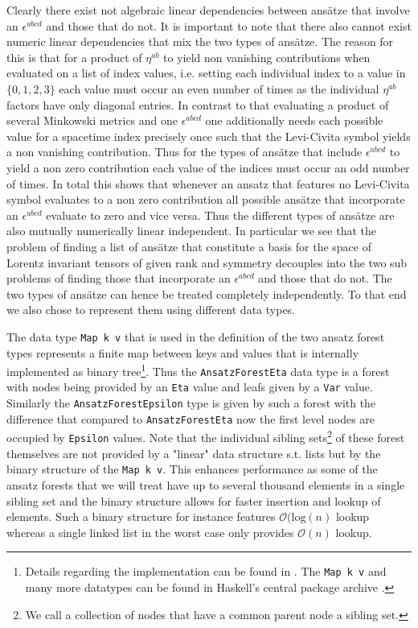 \documentclass[a4paper,12pt, DIV=14, BCOR=5mm, twoside, headsepline]{scrbook}
\begin{document}
Clearly there exist not algebraic linear dependencies between ansätze that involve an $\epsilon^{abcd}$ and those that do not. 
It is important to note that there also cannot exist numeric linear dependencies that mix the two types of ansätze. The reason for this is that for a product of $\eta^{ab}$ to yield non vanishing contributions when evaluated on a list of index values, i.e. setting each individual index to a value in $\{0,1,2,3 \}$ each value must occur an even number of times as the individual $\eta^{ab}$ factors have only diagonal entries. In contrast to that evaluating a product of several Minkowski metrics and one $\epsilon^{abcd}$ one additionally needs each possible value for a spacetime index precisely once such that the Levi-Civita symbol yields a non vanishing contribution. Thus for the types of ansätze that include $\epsilon^{abcd}$ to yield a non zero contribution each value of the indices must occur an odd number of times. In total this shows that whenever an ansatz that features no Levi-Civita symbol evaluates to a non zero contribution all possible ansätze that incorporate an $\epsilon^{abcd}$ evaluate to zero and vice versa. Thus the different types of ansätze are also mutually numerically linear independent. In particular we see that the problem of finding a list of ansätze that constitute a basis for the space of Lorentz invariant tensors of given rank and symmetry decouples into the two sub problems of finding those that incorporate an $\epsilon^{abcd}$ and those that do not. The two types of ansätze can hence be treated completely independently. To that end we also chose to represent them using different data types.

The data type \texttt{Map k v} that is used in the  definition of the two ansatz forest types represents a finite map between keys and values that is internally implemented as binary tree\footnote{Details regarding the implementation can be found in \cite{adams_1993}. The \texttt{Map k v} \cite{HackageMap} and many more datatypes can be found in Haskell's central package archive \cite{Hackage}.}. Thus the \texttt{AnsatzForestEta} data type is a forest with nodes being provided by an \texttt{Eta} value and leafs given by a \texttt{Var} value. Similarly the \texttt{AnsatzForestEpsilon} type is given by such a forest with the difference that compared to \texttt{AnsatzForestEta} now the first level nodes are occupied by \texttt{Epsilon} values. Note that the individual sibling sets\footnote{We call a collection of nodes that have a common parent node a sibling set.} of these forest themselves are not provided by a "linear" data structure s.t. lists but by the binary structure of the \texttt{Map k v}. This enhances performance as some of the ansatz forests that we will treat have up to several thousand elements in a single sibling set and the binary structure allows for faster insertion and lookup of elements. Such a binary structure for instance features $\mathcal{O}(\mathrm{log}(n)$ lookup whereas a single linked list in the worst case only provides $\mathcal{O}(n)$ lookup. 
\end{document}

